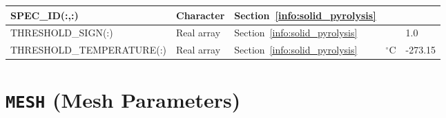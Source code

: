 \documentclass[11pt]{book}
\begin{document}
\begin{longtable}{@{\extracolsep{\fill}}|l|l|l|l|l|}
{\ct SPEC\_ID(:,:)}                 & Character     & Section~\ref{info:solid_pyrolysis}    &                   &        \\ \hline
{\ct THRESHOLD\_SIGN(:)}            & Real array    & Section~\ref{info:solid_pyrolysis}    &                   & 1.0    \\ \hline
{\ct THRESHOLD\_TEMPERATURE(:)}     & Real array    & Section~\ref{info:solid_pyrolysis}    & $^\circ$C         & -273.15 \\ \hline
\end{longtable}

\vspace{\baselineskip}



\section{\texorpdfstring{{\tt MESH}}{MESH} (Mesh Parameters)}
\end{document}
